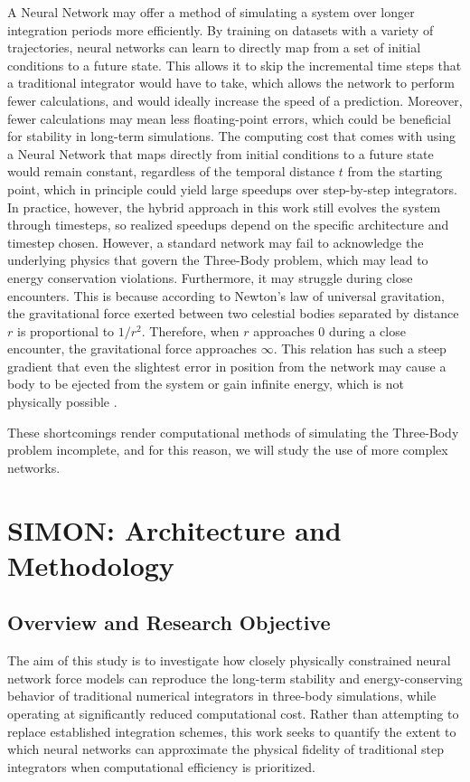 \documentclass[12pt]{article}
\begin{document}
A Neural Network may offer a method of simulating a system over longer integration periods more efficiently. By training on datasets with a variety of trajectories, neural networks can learn to directly map from a set of initial conditions to a future state. This allows it to skip the incremental time steps that a traditional integrator would have to take, which allows the network to perform fewer calculations, and would ideally increase the speed of a prediction. Moreover, fewer calculations may mean less floating-point errors, which could be beneficial for stability in long-term simulations. The computing cost that comes with using a Neural Network that maps directly from initial conditions to a future state would remain constant, regardless of the temporal distance $t$ from the starting point, which in principle could yield large speedups over step-by-step integrators. In practice, however, the hybrid approach in this work still evolves the system through timesteps, so realized speedups depend on the specific architecture and timestep chosen. However, a standard network may fail to acknowledge the underlying physics that govern the Three-Body problem, which may lead to energy conservation violations. Furthermore, it may struggle during close encounters. This is because according to Newton's law of universal gravitation, the gravitational force exerted between two celestial bodies separated by distance $r$ is proportional to $1/r^2$. Therefore, when $r$ approaches $0$ during a close encounter, the gravitational force approaches $\infty$. This relation has such a steep gradient that even the slightest error in position from the network may cause a body to be ejected from the system or gain infinite energy, which is not physically possible \cite{Dehnen2001}.

These shortcomings render computational methods of simulating the Three-Body problem incomplete, and for this reason, we will study the use of more complex networks.

\section{SIMON: Architecture and Methodology}
\label{sec:methodology}

\subsection{Overview and Research Objective}
\label{research_obj}
The aim of this study is to investigate how closely physically constrained neural network force models can reproduce the long-term stability and energy-conserving behavior of traditional numerical integrators in three-body simulations, while operating at significantly reduced computational cost. Rather than attempting to replace established integration schemes, this work seeks to quantify the extent to which neural networks can approximate the physical fidelity of traditional step integrators when computational efficiency is prioritized.
\end{document}
